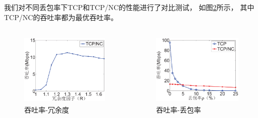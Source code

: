 \begin{frame}[allowframebreaks]
	我们对不同丢包率下TCP和TCP/NC的性能进行了对比测试，
	如图\ref{fig:throughput2loss}所示，
	其中TCP/NC的吞吐率都为最优吞吐率。
	\begin{columns}
		\begin{column}{0.5\textwidth}
			\begin{figure}
				\includegraphics[height=3.5cm]{../figures/redundancy.eps}
				\caption{吞吐率-冗余度}
				\label{fig:throughput2redundancy}
			\end{figure}
		\end{column}
		\begin{column}{0.5\textwidth}
			\begin{figure}
				\includegraphics[height=3.5cm]{../figures/throughput2lossrate.eps}
				\caption{吞吐率-丢包率}
				\label{fig:throughput2loss}
			\end{figure}
		\end{column}
	\end{columns}
\end{frame}
















